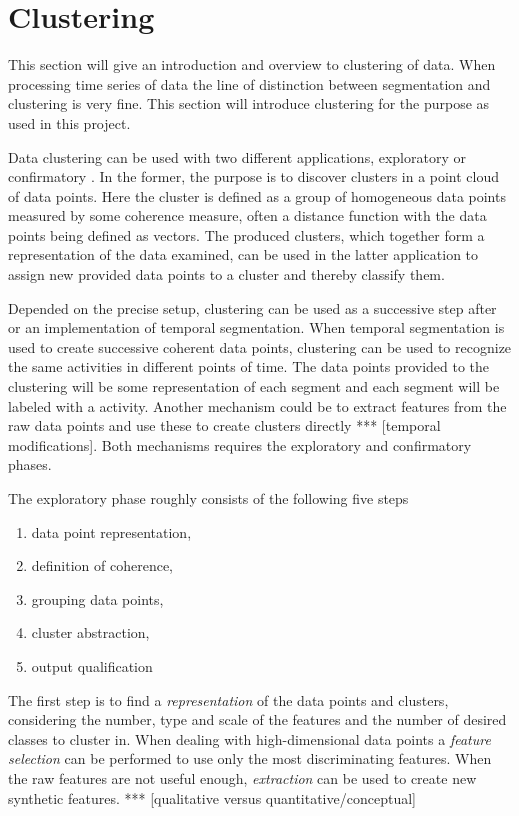 \section{Clustering}

This section will give an introduction and overview to clustering of data. 
When processing time series of data the line of distinction between 
segmentation and clustering is very fine. This section will introduce 
clustering for the purpose as used in this project.

Data clustering can be used with two different applications, exploratory or 
confirmatory \cite{jain1999data}. In the former, the purpose is to discover 
clusters in a point cloud of data points. Here the cluster is defined as a 
group of homogeneous data points measured by some coherence measure, often a 
distance function with the data points being defined as vectors. The produced 
clusters, which together form a representation of the data examined, can be 
used in the 
latter application to assign new provided data points to a cluster and thereby 
classify them.

Depended on the precise setup, clustering can be used as a successive step 
after or an implementation of temporal segmentation. When temporal 
segmentation is used to create successive coherent data points, clustering can 
be used to recognize the same activities in different points of time. The data 
points provided to the clustering will be some representation of each segment 
and each segment will be labeled with a activity. Another mechanism could be 
to extract features from the raw data points and use these to create clusters 
directly *** [temporal modifications]. Both mechanisms requires the 
exploratory and confirmatory phases.

The exploratory phase roughly consists of the following five steps 
\cite{jain1999data}
\begin{enumerate}
	\item data point representation,
	\item definition of coherence,
	\item grouping data points,
	\item cluster abstraction,
	\item output qualification
\end{enumerate}

The first step is to find a \emph{representation} of the data points and 
clusters, considering the number, type and scale of the features and the 
number of desired classes to cluster in. When dealing with high-dimensional 
data points a \emph{feature selection} can be performed to use only the most 
discriminating features. When the raw features are not useful enough, 
\emph{extraction} can be used to create new synthetic features. *** 
[qualitative versus quantitative/conceptual]

